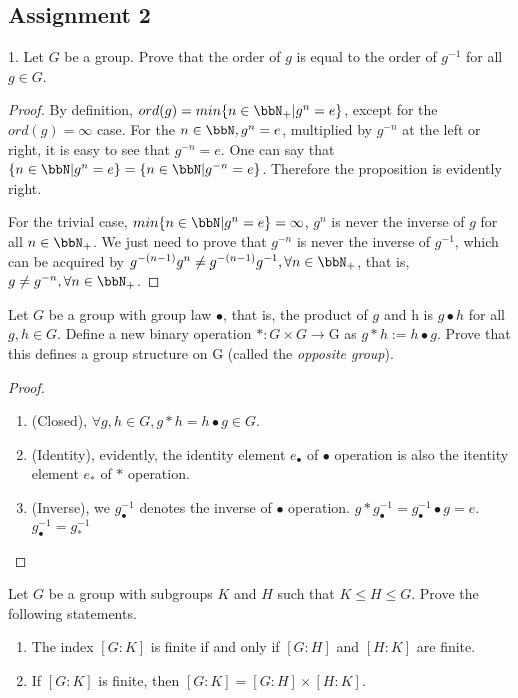 \subsection{Assignment 2}

\begin{exercise}
1. Let $G$ be a group. Prove that the order of $g$ is equal to the order of $g^{-1}$ for all $g\in G$.
\end{exercise}

\begin{proof}
By definition, $ord(g)=min\{n\in\bbN_+|g^n=e\}$, except for the $ord(g)=\infty$ case. For the $n\in\bbN, g^n=e$, multiplied by $g^{-n}$ at the left or right, it is easy to see that $g^{-n}=e$. One can say that $\{n\in\bbN|g^n=e\}=\{n\in\bbN|g^{-n}=e\}$. Therefore the proposition is evidently right.

For the trivial case, $min\{n\in\bbN|g^n=e\}=\infty$, $g^n$ is never the inverse of $g$ for all $n\in \bbN_+$. We just need to prove that $g^{-n}$ is never the inverse of $g^{-1}$, which can be acquired by $g^{-(n-1)}g^n\neq g^{-(n-1)}g^{-1}, \forall n\in\bbN_+$, that is, $g\neq g^{-n}, \forall n\in\bbN_+$.
\end{proof}

\begin{exercise}
    Let $G$ be a group with group law $\bullet$, that is, the product of $g$ and h is $g \bullet h$ for all $g, h \in G$.
    Define a new binary operation $* : G \times G \rightarrow $G as $g * h := h \bullet g$. Prove that this defines a group structure on G (called the \textit{opposite group}).
\end{exercise}

\begin{proof}
    \begin{enumerate}
        \item (Closed), $\forall g,h \in G, g*h=h\bullet g\in G$.
        \item (Identity), evidently, the identity element $e_{\bullet}$ of $\bullet$ operation is also the itentity element $e_{*}$ of $*$ operation.
        \item (Inverse), we $g^{-1}_{\bullet}$ denotes the inverse of $\bullet$ operation. $g*g^{-1}_{\bullet}=g^{-1}_{\bullet} \bullet g=e$. $g^{-1}_{\bullet}=g^{-1}_{*}$
    \end{enumerate}
\end{proof}

\begin{exercise}
    Let $G$ be a group with subgroups $K$ and $H$ such that $K \leq H \leq G$. Prove the following statements.
    \begin{enumerate}
        \item  The index $[G : K]$ is finite if and only if $[G : H]$ and $[H : K]$ are finite.
        \item If $[G : K]$ is finite, then $[G : K] = [G : H] \times [H : K]$.

    \end{enumerate}
\end{exercise}

